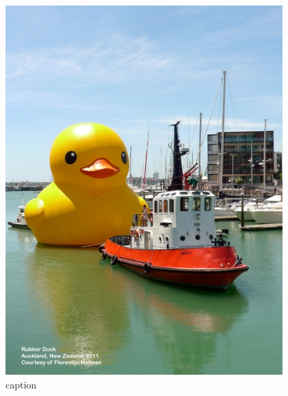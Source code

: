 \begin{figure}[hb!]
  \centering
  \includegraphics[width=0.95\textwidth]{img/rubberduck.jpg}
  \caption{caption}
  \label{fig:label}
\end{figure}





